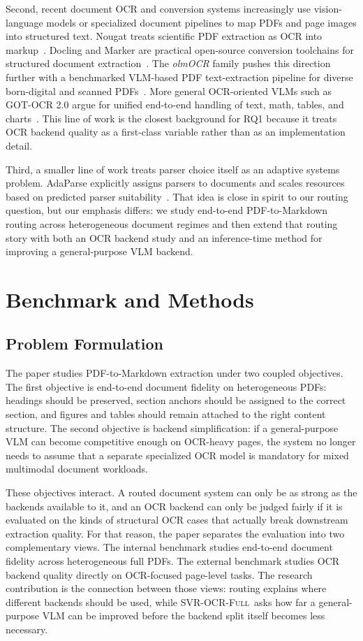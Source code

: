 \documentclass[conference]{IEEEtran}
\newcommand{\papername}[1]{\textit{#1}}
\newcommand{\svrocr}{\textsc{SVR-OCR-Full}}
\begin{document}
Second, recent document OCR and conversion systems increasingly use vision-language models or specialized document pipelines to map PDFs and page images into structured text. Nougat treats scientific PDF extraction as OCR into markup~\cite{nougat}. Docling and Marker are practical open-source conversion toolchains for structured document extraction~\cite{docling,marker}. The \papername{olmOCR} family pushes this direction further with a benchmarked VLM-based PDF text-extraction pipeline for diverse born-digital and scanned PDFs~\cite{olmocr}. More general OCR-oriented VLMs such as GOT-OCR 2.0 argue for unified end-to-end handling of text, math, tables, and charts~\cite{gotocr}. This line of work is the closest background for RQ1 because it treats OCR backend quality as a first-class variable rather than as an implementation detail.

Third, a smaller line of work treats parser choice itself as an adaptive systems problem. AdaParse explicitly assigns parsers to documents and scales resources based on predicted parser suitability~\cite{adaparse}. That idea is close in spirit to our routing question, but our emphasis differs: we study end-to-end PDF-to-Markdown routing across heterogeneous document regimes and then extend that routing story with both an OCR backend study and an inference-time method for improving a general-purpose VLM backend.

\section{Benchmark and Methods}

\subsection{Problem Formulation}

The paper studies PDF-to-Markdown extraction under two coupled objectives. The first objective is end-to-end document fidelity on heterogeneous PDFs: headings should be preserved, section anchors should be assigned to the correct section, and figures and tables should remain attached to the right content structure. The second objective is backend simplification: if a general-purpose VLM can become competitive enough on OCR-heavy pages, the system no longer needs to assume that a separate specialized OCR model is mandatory for mixed multimodal document workloads.

These objectives interact. A routed document system can only be as strong as the backends available to it, and an OCR backend can only be judged fairly if it is evaluated on the kinds of structural OCR cases that actually break downstream extraction quality. For that reason, the paper separates the evaluation into two complementary views. The internal benchmark studies end-to-end document fidelity across heterogeneous full PDFs. The external benchmark studies OCR backend quality directly on OCR-focused page-level tasks. The research contribution is the connection between those views: routing explains where different backends should be used, while \svrocr\ asks how far a general-purpose VLM can be improved before the backend split itself becomes less necessary.
\end{document}
